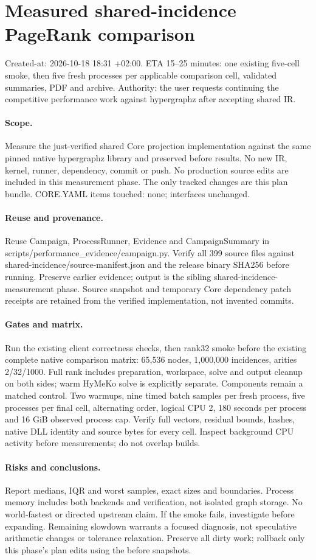 \documentclass[11pt]{article}
\begin{document}
\newpage\section*{Measured shared-incidence PageRank comparison}
Created-at: 2026-10-18 18:31 +02:00. ETA 15--25 minutes: one existing
five-cell smoke, then five fresh processes per applicable comparison cell,
validated summaries, PDF and archive. Authority: the user requests continuing
the competitive performance work against hypergraphz after accepting shared IR.
\paragraph{Scope.} Measure the just-verified shared Core projection implementation
against the same pinned native hypergraphz library and preserved before results.
No new IR, kernel, runner, dependency, commit or push. No production source edits
are included in this measurement phase. The only tracked changes are this plan
bundle. CORE.YAML items touched: none; interfaces unchanged.
\paragraph{Reuse and provenance.} Reuse Campaign, ProcessRunner, Evidence and
CampaignSummary in scripts/performance\_evidence/campaign.py. Verify all 399
source files against shared-incidence/source-manifest.json and the release binary
SHA256 before running. Preserve earlier evidence; output is the sibling
shared-incidence-measurement phase. Source snapshot and temporary Core dependency
patch receipts are retained from the verified implementation, not invented commits.
\paragraph{Gates and matrix.} Run the existing client correctness checks, then
rank32 smoke before the existing complete native comparison matrix: 65,536 nodes,
1,000,000 incidences, arities 2/32/1000. Full rank includes preparation, workspace,
solve and output cleanup on both sides; warm HyMeKo solve is explicitly separate.
Components remain a matched control. Two warmups, nine timed batch samples per
fresh process, five processes per final cell, alternating order, logical CPU 2,
180 seconds per process and 16 GiB observed process cap. Verify full vectors,
residual bounds, hashes, native DLL identity and source bytes for every cell.
Inspect background CPU activity before measurements; do not overlap builds.
\paragraph{Risks and conclusions.} Report medians, IQR and worst samples, exact
sizes and boundaries. Process memory includes both backends and verification,
not isolated graph storage. No world-fastest or directed upstream claim. If the
smoke fails, investigate before expanding. Remaining slowdown warrants a focused
diagnosis, not speculative arithmetic changes or tolerance relaxation. Preserve
all dirty work; rollback only this phase's plan edits using the before snapshots.
\end{document}
